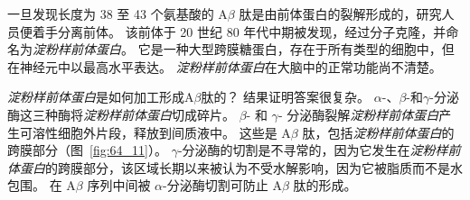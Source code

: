 一旦发现长度为 38 至 43 个氨基酸的 A$\beta$ 肽是由前体蛋白的裂解形成的，研究人员便着手分离前体。
该前体于 20 世纪 80 年代中期被发现，经过分子克隆，并命名为\textit{淀粉样前体蛋白}。
它是一种大型跨膜糖蛋白，存在于所有类型的细胞中，但在神经元中以最高水平表达。
\textit{淀粉样前体蛋白}在大脑中的正常功能尚不清楚。


\textit{淀粉样前体蛋白}是如何加工形成A$\beta$肽的？
结果证明答案很复杂。
$\alpha$-、$\beta$-和$\gamma$-分泌酶这三种酶将\textit{淀粉样前体蛋白}切成碎片。
$\beta$- 和 $\gamma$- 分泌酶裂解\textit{淀粉样前体蛋白}产生可溶性细胞外片段，释放到间质液中。
这些是 A$\beta$ 肽，包括\textit{淀粉样前体蛋白}的跨膜部分（图~\ref{fig:64_11}）。
$\gamma$-分泌酶的切割是不寻常的，因为它发生在\textit{淀粉样前体蛋白}的跨膜部分，该区域长期以来被认为不受水解影响，因为它被脂质而不是水包围。
在 A$\beta$ 序列中间被 $\alpha$-分泌酶切割可防止 A$\beta$ 肽的形成。


